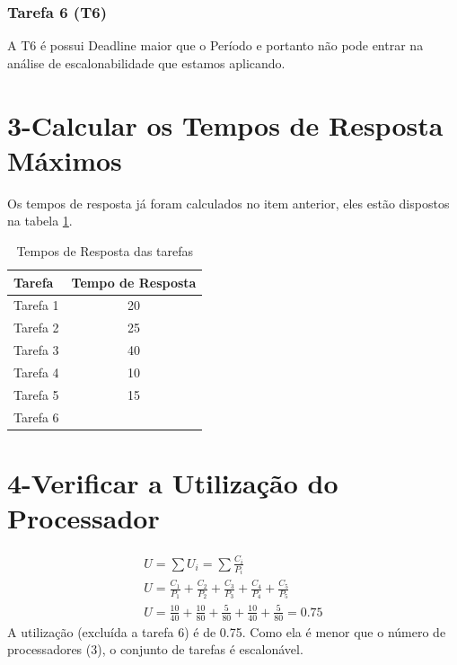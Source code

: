 \documentclass[12pt,a4paper]{article}
\begin{document}
\subsubsection*{Tarefa 6 (T6)}
A T6 é possui Deadline maior que o Período e portanto não pode entrar na análise de escalonabilidade que estamos aplicando.

\section*{3-Calcular os Tempos de Resposta Máximos}
Os tempos de resposta já foram calculados no item anterior, eles estão dispostos na tabela \ref{table:2}.
\begin{table}[H]
\centering
\begin{tabular}{|c|c|}
\hline
\multicolumn{1}{|l|}{Tarefa} & \multicolumn{1}{l|}{Tempo de Resposta} \\ \hline
Tarefa 1                     & 20                                     \\ \hline
Tarefa 2                     & 25                                     \\ \hline
Tarefa 3                     & 40                                     \\ \hline
Tarefa 4                     & 10                                     \\ \hline
Tarefa 5                     & 15                                     \\ \hline
Tarefa 6                     &                                        \\ \hline
\end{tabular}
\caption{Tempos de Resposta das tarefas}
\label{table:2}
\end{table}

\section*{4-Verificar a Utilização do Processador}
\begin{gather*}
U=\sum U_i = \sum\frac{C_i}{P_i}\\
U = \frac{C_1}{P_1} +  \frac{C_2}{P_2} +  \frac{C_3}{P_3} +  \frac{C_4}{P_4} +  \frac{C_5}{P_5}\\
U =  \frac{10}{40} +  \frac{10}{80} +  \frac{5}{80} +  \frac{10}{40} +  \frac{5}{80} = 0.75
\end{gather*}
A utilização (excluída a tarefa 6) é de 0.75. Como ela é menor que o número de processadores (3), o conjunto de tarefas é escalonável.
\printbibliography
\end{document}
